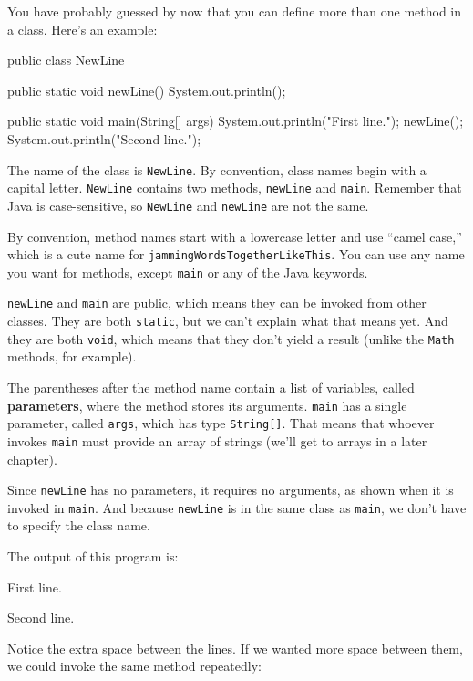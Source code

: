 \documentclass[12pt]{book}
\theoremstyle{exercise}
\newcommand{\java}[1]{\verb"#1"}
\begin{document}
You have probably guessed by now that you can define more than one method in a class.
Here's an example:

\begin{code}
public class NewLine {

    public static void newLine() {
        System.out.println();
    }

    public static void main(String[] args) {
        System.out.println("First line.");
        newLine();
        System.out.println("Second line.");
    }
}
\end{code}

The name of the class is \java{NewLine}.
By convention, class names begin with a capital letter.
\java{NewLine} contains two methods, \java{newLine} and \java{main}.
Remember that Java is case-sensitive, so \java{NewLine} and \java{newLine} are not the same.

By convention, method names start with a lowercase letter and use ``camel case,'' which is a cute name for \java{jammingWordsTogetherLikeThis}.
You can use any name you want for methods, except \java{main} or any of the Java keywords.


\java{newLine} and \java{main} are public, which means they can be invoked from other classes.
They are both \java{static}, but we can't explain what that means yet.
And they are both \java{void}, which means that they don't yield a result (unlike the \java{Math} methods, for example).


The parentheses after the method name contain a list of variables, called {\bf parameters}, where the method stores its arguments.
\java{main} has a single parameter, called \java{args}, which has type \java{String[]}.
That means that whoever invokes \java{main} must provide an array of strings (we'll get to arrays in a later chapter).

Since \java{newLine} has no parameters, it requires no arguments, as shown when it is invoked in \java{main}.
And because \java{newLine} is in the same class as \java{main}, we don't have to specify the class name.

The output of this program is:

\begin{stdout}
First line.

Second line.
\end{stdout}

Notice the extra space between the lines.
If we wanted more space between them, we could invoke the same method repeatedly:
\end{document}
